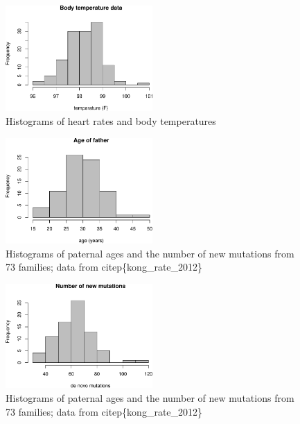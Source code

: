 \documentclass[
  letterpaper,
  DIV=11,
  numbers=noendperiod]{scrreprt}
\begin{document}
\begin{figure}[H]

{\centering \includegraphics[width=0.5\textwidth,height=\textheight]{./descriptive_files/figure-pdf/fig-ch3-HR-2.pdf}

}

\caption{\label{fig-ch3-HR-2}Histograms of heart rates and body
temperatures}

\end{figure}

\begin{figure}

{\centering \includegraphics[width=0.5\textwidth,height=\textheight]{./descriptive_files/figure-pdf/fig-ch3-mut-1.pdf}

}

\caption{\label{fig-ch3-mut-1}Histograms of paternal ages and the number
of new mutations from 73 families; data from citep\{kong\_rate\_2012\}}

\end{figure}

\begin{figure}

{\centering \includegraphics[width=0.5\textwidth,height=\textheight]{./descriptive_files/figure-pdf/fig-ch3-mut-2.pdf}

}

\caption{\label{fig-ch3-mut-2}Histograms of paternal ages and the number
of new mutations from 73 families; data from citep\{kong\_rate\_2012\}}

\end{figure}
\end{document}
